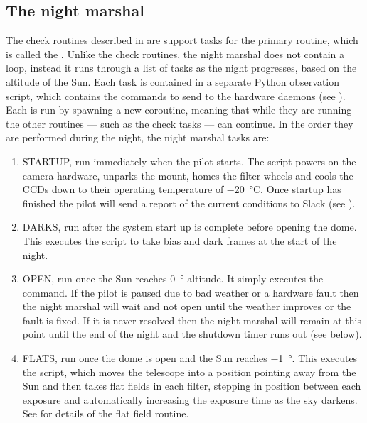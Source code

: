 \subsection{The night marshal}
\label{sec:night_marshal}
\begin{colsection}

The check routines described in  are support tasks for the primary routine, which is called the . Unlike the check routines, the night marshal does not contain a loop, instead it runs through a list of tasks as the night progresses, based on the altitude of the Sun. Each task is contained in a separate Python observation script, which contains the commands to send to the hardware daemons (see ). Each is run by spawning a new coroutine, meaning that while they are running the other routines --- such as the check tasks --- can continue. In the order they are performed during the night, the night marshal tasks are:

\begin{enumerate}

\item STARTUP, run immediately when the pilot starts. The  script powers on the camera hardware, unparks the mount, homes the filter wheels and cools the CCDs down to their operating temperature of \SI{-20}{\celsius}. Once startup has finished the pilot will send a report of the current conditions to Slack (see ).

\item DARKS, run after the system start up is complete before opening the dome. This executes the  script to take bias and dark frames at the start of the night.

\item OPEN, run once the Sun reaches \SI{0}{\degree} altitude. It simply executes the  command. If the pilot is paused due to bad weather or a hardware fault then the night marshal will wait and not open until the weather improves or the fault is fixed. If it is never resolved then the night marshal will remain at this point until the end of the night and the shutdown timer runs out (see below).

\item FLATS, run once the dome is open and the Sun reaches \SI{-1}{\degree}. This executes the  script, which moves the telescope into a position pointing away from the Sun and then takes flat fields in each filter, stepping in position between each exposure and automatically increasing the exposure time as the sky darkens. See  for details of the flat field routine.


\end{enumerate}
\end{colsection}
